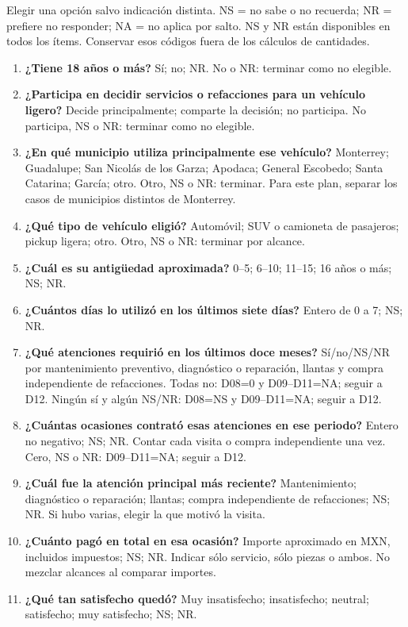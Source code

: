 {Elegir una opción salvo indicación distinta. NS = no sabe o no recuerda; NR = prefiere no responder; NA = no aplica por salto. NS y NR están disponibles en todos los ítems. Conservar esos códigos fuera de los cálculos de cantidades.
\begin{enumerate}
\item[D01.] \textbf{¿Tiene 18 años o más?} Sí; no; NR. No o NR: terminar como no elegible.
\item[D02.] \textbf{¿Participa en decidir servicios o refacciones para un vehículo ligero?} Decide principalmente; comparte la decisión; no participa. No participa, NS o NR: terminar como no elegible.
\item[D03.] \textbf{¿En qué municipio utiliza principalmente ese vehículo?} Monterrey; Guadalupe; San Nicolás de los Garza; Apodaca; General Escobedo; Santa Catarina; García; otro. Otro, NS o NR: terminar. Para este plan, separar los casos de municipios distintos de Monterrey.
\item[D04.] \textbf{¿Qué tipo de vehículo eligió?} Automóvil; SUV o camioneta de pasajeros; pickup ligera; otro. Otro, NS o NR: terminar por alcance.
\item[D05.] \textbf{¿Cuál es su antigüedad aproximada?} 0--5; 6--10; 11--15; 16 años o más; NS; NR.
\item[D06.] \textbf{¿Cuántos días lo utilizó en los últimos siete días?} Entero de 0 a 7; NS; NR.
\item[D07.] \textbf{¿Qué atenciones requirió en los últimos doce meses?} Sí/no/NS/NR por mantenimiento preventivo, diagnóstico o reparación, llantas y compra independiente de refacciones. Todas no: D08=0 y D09--D11=NA; seguir a D12. Ningún sí y algún NS/NR: D08=NS y D09--D11=NA; seguir a D12.
\item[D08.] \textbf{¿Cuántas ocasiones contrató esas atenciones en ese periodo?} Entero no negativo; NS; NR. Contar cada visita o compra independiente una vez. Cero, NS o NR: D09--D11=NA; seguir a D12.
\item[D09.] \textbf{¿Cuál fue la atención principal más reciente?} Mantenimiento; diagnóstico o reparación; llantas; compra independiente de refacciones; NS; NR. Si hubo varias, elegir la que motivó la visita.
\item[D10.] \textbf{¿Cuánto pagó en total en esa ocasión?} Importe aproximado en MXN, incluidos impuestos; NS; NR. Indicar sólo servicio, sólo piezas o ambos. No mezclar alcances al comparar importes.
\item[D11.] \textbf{¿Qué tan satisfecho quedó?} Muy insatisfecho; insatisfecho; neutral; satisfecho; muy satisfecho; NS; NR.

\end{enumerate}}
